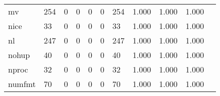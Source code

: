 \begin{longtable}{lp{1.2cm}p{1.2cm}p{1.2cm}p{1.2cm}p{1.2cm}p{1.2cm}p{1.2cm}p{1.2cm}p{1.2cm}p{1.2cm}}
mv        &                                   254 &                                                  0 &                                                  0 &                                                  0 &                                                  0 &                                                254 &                                              1.000 &                                              1.000 &                                              1.000 \\
nice      &                                    33 &                                                  0 &                                                  0 &                                                  0 &                                                  0 &                                                 33 &                                              1.000 &                                              1.000 &                                              1.000 \\
nl        &                                   247 &                                                  0 &                                                  0 &                                                  0 &                                                  0 &                                                247 &                                              1.000 &                                              1.000 &                                              1.000 \\
nohup     &                                    40 &                                                  0 &                                                  0 &                                                  0 &                                                  0 &                                                 40 &                                              1.000 &                                              1.000 &                                              1.000 \\
nproc     &                                    32 &                                                  0 &                                                  0 &                                                  0 &                                                  0 &                                                 32 &                                              1.000 &                                              1.000 &                                              1.000 \\
numfmt    &                                    70 &                                                  0 &                                                  0 &                                                  0 &                                                  0 &                                                 70 &                                              1.000 &                                              1.000 &                                              1.000 \\

\end{longtable}
